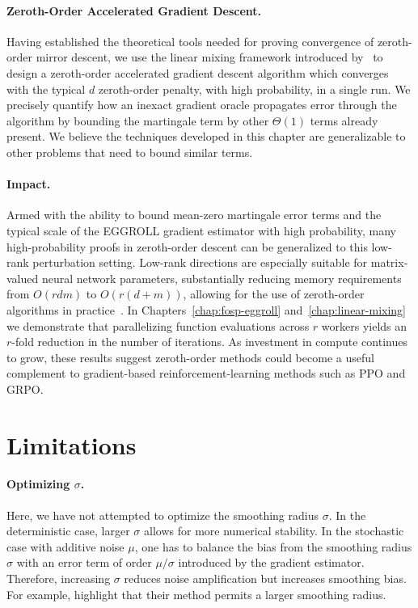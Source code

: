 \paragraph{Zeroth-Order Accelerated Gradient Descent.} Having established the theoretical tools needed for proving convergence of zeroth-order mirror descent, we use the linear mixing framework introduced by~\citet{allenZhu2016linear} to design a zeroth-order accelerated gradient descent algorithm which converges with the typical $d$ zeroth-order penalty, with high probability, in a single run. We precisely quantify how an inexact gradient oracle propagates error through the algorithm by bounding the martingale term by other $\Theta(1)$ terms already present. We believe the techniques developed in this chapter are generalizable to other problems that need to bound similar terms.

\paragraph{Impact.} Armed with the ability to bound mean-zero martingale error terms and the typical scale of the EGGROLL gradient estimator with high probability, many high-probability proofs in zeroth-order descent can be generalized to this low-rank perturbation setting. Low-rank directions are especially suitable for matrix-valued neural network parameters, substantially reducing memory requirements from $O(rdm)$ to $O(r(d+m))$, allowing for the use of zeroth-order algorithms in practice~\citep{sarkar2025evolution}. In Chapters~\ref{chap:fosp-eggroll} and~\ref{chap:linear-mixing} we demonstrate that parallelizing function evaluations across $r$ workers yields an $r$-fold reduction in the number of iterations. As investment in compute continues to grow, these results suggest zeroth-order methods could become a useful complement to gradient-based reinforcement-learning methods such as PPO and GRPO.

\section{Limitations}
\paragraph{Optimizing $\sigma$.}
Here, we have not attempted to optimize the smoothing radius $\sigma$. In the deterministic case, larger $\sigma$ allows for more numerical stability. In the stochastic case with additive noise $\mu$, one has to balance the bias from the smoothing radius $\sigma$ with an error term of order $\mu/\sigma$ introduced by the gradient estimator. Therefore, increasing $\sigma$ reduces noise amplification but increases smoothing bias. For example, \citet{he2024riemannian} highlight that their method permits a larger smoothing radius.

